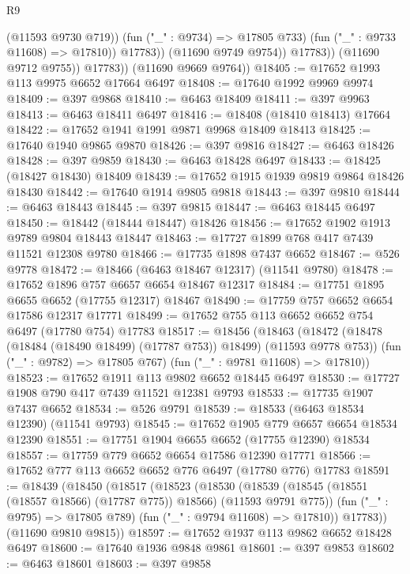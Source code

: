 \begin{lexlean}{R9}
\begin{coremodule}
{{{{{{{{{{{{{{{{{{{{{{{{{{{{{{{{{{{{{{{{{{{{{{{{{{{{{{{{{{{{{{{{{{{{{{{{{{{{{{{{{{{{                          (@11593 @9730 @719))
                        (fun ("_" : @9734) => @17805 @733)
                        (fun ("_" : @9733 @11608) => @17810))
                      @17783))
                  (@11690 @9749 @9754))
                @17783))
            (@11690 @9712 @9755))
          @17783))
      (@11690 @9669 @9764))
@18405 := @17652 @1993 @113 @9975 @6652 @17664 @6497
@18408 := @17640 @1992 @9969 @9974
@18409 := @397 @9868
@18410 := @6463 @18409
@18411 := @397 @9963
@18413 := @6463 @18411 @6497
@18416 := @18408 (@18410 @18413) @17664
@18422 := @17652 @1941 @1991 @9871 @9968 @18409 @18413
@18425 := @17640 @1940 @9865 @9870
@18426 := @397 @9816
@18427 := @6463 @18426
@18428 := @397 @9859
@18430 := @6463 @18428 @6497
@18433 := @18425 (@18427 @18430) @18409
@18439 := @17652 @1915 @1939 @9819 @9864 @18426 @18430
@18442 := @17640 @1914 @9805 @9818
@18443 := @397 @9810
@18444 := @6463 @18443
@18445 := @397 @9815
@18447 := @6463 @18445 @6497
@18450 := @18442 (@18444 @18447) @18426
@18456 := @17652 @1902 @1913 @9789 @9804 @18443 @18447
@18463 := @17727 @1899 @768 @417 @7439 @11521 @12308 @9780
@18466 := @17735 @1898 @7437 @6652
@18467 := @526 @9778
@18472 := @18466 (@6463 @18467 @12317) (@11541 @9780)
@18478 := @17652 @1896 @757 @6657 @6654 @18467 @12317
@18484 := @17751 @1895 @6655 @6652 (@17755 @12317) @18467
@18490 := @17759 @757 @6652 @6654 @17586 @12317 @17771
@18499 := @17652 @755 @113 @6652 @6652 @754 @6497 (@17780 @754) @17783
@18517 := @18456
    (@18463
      (@18472 (@18478 (@18484 (@18490 @18499) (@17787 @753)) @18499) (@11593 @9778 @753))
      (fun ("_" : @9782) => @17805 @767)
      (fun ("_" : @9781 @11608) => @17810))
@18523 := @17652 @1911 @113 @9802 @6652 @18445 @6497
@18530 := @17727 @1908 @790 @417 @7439 @11521 @12381 @9793
@18533 := @17735 @1907 @7437 @6652
@18534 := @526 @9791
@18539 := @18533 (@6463 @18534 @12390) (@11541 @9793)
@18545 := @17652 @1905 @779 @6657 @6654 @18534 @12390
@18551 := @17751 @1904 @6655 @6652 (@17755 @12390) @18534
@18557 := @17759 @779 @6652 @6654 @17586 @12390 @17771
@18566 := @17652 @777 @113 @6652 @6652 @776 @6497 (@17780 @776) @17783
@18591 := @18439
    (@18450
      (@18517
        (@18523
          (@18530
            (@18539 (@18545 (@18551 (@18557 @18566) (@17787 @775)) @18566) (@11593 @9791 @775))
            (fun ("_" : @9795) => @17805 @789)
            (fun ("_" : @9794 @11608) => @17810))
          @17783))
      (@11690 @9810 @9815))
@18597 := @17652 @1937 @113 @9862 @6652 @18428 @6497
@18600 := @17640 @1936 @9848 @9861
@18601 := @397 @9853
@18602 := @6463 @18601
@18603 := @397 @9858
}}}}}}}}}}}}}}}}}}}}}}}}}}}}}}}}}}}}}}}}}}}}}}}}}}}}}}}}}}}}}}}}}}}}}}}}}}}}}}}}}}}}
\end{coremodule}
\end{lexlean}
